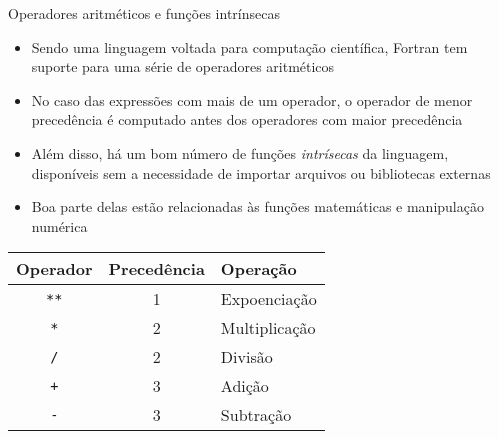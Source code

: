 \begin{frame}[fragile]{Operadores aritméticos e funções intrínsecas}

    \begin{itemize}
        \item Sendo uma linguagem voltada para computação científica, Fortran tem suporte para
            uma série de operadores aritméticos

        \item No caso das expressões com mais de um operador, o operador de menor precedência é
            computado antes dos operadores com maior precedência
        \item Além disso, há um bom número de funções \textit{intrísecas} da linguagem, disponíveis
            sem a necessidade de importar arquivos ou bibliotecas externas

        \item Boa parte delas estão relacionadas às funções matemáticas e manipulação
            numérica
    \end{itemize}

    \begin{table}[ht]
        \centering
        \begin{tabular}{ccl}
            \toprule
            \textbf{Operador} & \textbf{Precedência} & \textbf{Operação} \\
            \midrule
                \texttt{**} & 1 & Expoenciação \\
                \texttt{*} & 2 & Multiplicação \\
                \texttt{/} & 2 & Divisão \\
                \texttt{+} & 3 & Adição \\
                \texttt{-} & 3 & Subtração \\
            \bottomrule
        \end{tabular}
    \end{table}
\end{frame}

